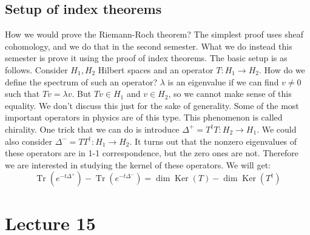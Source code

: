 \documentclass[12 pt]{article}
\DeclareMathOperator {\Tr}{Tr}
\DeclareMathOperator {\Ker}{Ker}
\theoremstyle{plain}
\theoremstyle{definition}
\theoremstyle{remark}
\begin{document}
\subsection*{Setup of index theorems}
How we would prove the Riemann-Roch theorem? The simplest proof uses sheaf cohomology, and we do that in the second semester. What we do instead this semester is prove it using the proof of index theorems. The basic setup is as follows. Consider $H_1, H_2$ Hilbert spaces and an operator $T : H_1 \to H_2$. How do we define the spectrum of such an operator? $\lambda$ is an eigenvalue if we can find $v\neq 0$ such that $Tv = \lambda v$. But $Tv \in H_1$ and $v\in H_2$, so we cannot make sense of this equality. We don't discuss this just for the sake of generality. Some of the most important operators in physics are of this type. This phenomenon is called chirality. One trick that we can do is introduce $\Delta^{+} = T^{\dagger}T :H_2 \to H_1$. We could also consider $\Delta^{-} = TT^{\dagger} :H_1 \to H_2$. It turns out that the nonzero eigenvalues of these operators are in 1-1 correspondence, but the zero ones are not. Therefore we are interested in studying the kernel of these operators. We will get:
\[      \Tr(e^{-t\Delta^+}) - \Tr(e^{-t\Delta^-})   = \dim \Ker(T) - \dim \Ker(T^{\dagger})   \]


\section*{Lecture 15}
\end{document}
